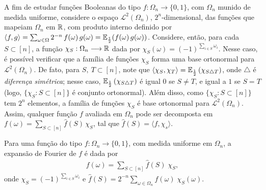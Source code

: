 A fim de estudar funções Booleanas do tipo $f: \Omega_n \longrightarrow \{0, 1\}$, com $\Omega_n$ munido de medida uniforme, considere o espaço $\mathcal{L}^2(\Omega_n)$, $2^n$-dimensional, das funções que mapeiam $\Omega_n$ em $\operatorname{\mathbb{R}}$, com produto interno definido por $\langle f, g \rangle = \sum_{\omega \in \Omega} 2^{-n}\,f(\omega)\,g(\omega) = \operatorname{\mathbb{E}}_{\frac{1}{2}}(f(\omega) \, g(\omega))$. Considere, então, para cada $S \subset [n]$, a função $\chi_S: \Omega_n \longrightarrow \operatorname{\mathbb{R}}$ dada por $\chi_S(\omega) = (-1)^{\sum_{i \in S}\omega_i}$. Nesse caso, é possível verificar que a família de funções $\chi_S$ forma uma base ortonormal para $\mathcal{L}^2(\Omega_n)$. De fato, para $S, ~T \subset [n]$, note que $\langle \chi_S,\chi_T \rangle = \operatorname{\mathbb{E}}_{\frac{1}{2}}\left(\chi_{S \triangle T}\right)$, onde $\triangle$ é \textit{diferença simétrica}; nesse caso, $\operatorname{\mathbb{E}}_{\frac{1}{2}}\left(\chi_{S \triangle T}\right)$ é igual $0$ se $S \neq T$, e igual a $1$ se $S = T$ (logo, $\{\chi_S : S \subset [n]\}$ é conjunto ortonormal). Além disso, como $\{\chi_S : S \subset [n]\}$ tem $2^n$ elementos, a família de funções $\chi_S$ é base ortonormal para $\mathcal{L}^2(\Omega_n)$. Assim, qualquer função $f$ avaliada em $\Omega_n$ pode ser decomposta em $f(\omega) = \sum_{S \subset [n]} \widehat{f}(S) \, \chi_S$, tal que $\widehat{f}(S) = \langle f , \chi_s\rangle$.

\begin{mydef}\label{def-fourier}
	Para uma função do tipo $f:\Omega_n \longrightarrow \{0,1\}$, com medida uniforme em $\Omega_n$, a expansão de Fourier de $f$ é dada por \vspace{-2pt}
	\begin{align*}
		f(\omega) = \sum_{S \subset [n]} \widehat{f}(S) \; \chi_S,
	\end{align*}
	onde $\chi_S = (-1)^{\sum_{i \in S}\omega_i}$ e $\widehat{f}(S) = 2^{-n}\sum_{\omega \in \Omega_n}f(\omega) \; \chi_S(\omega)$.
\end{mydef}

